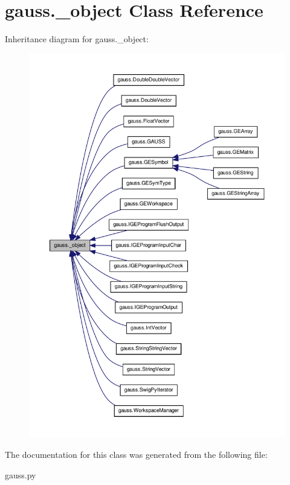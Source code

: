 \hypertarget{classgauss_1_1__object}{\section{gauss.\-\_\-object Class Reference}
\label{classgauss_1_1__object}
}


Inheritance diagram for gauss.\-\_\-object\-:\nopagebreak
\begin{figure}[H]
\begin{center}
\leavevmode
\includegraphics[width=350pt]{classgauss_1_1__object__inherit__graph}
\end{center}
\end{figure}


The documentation for this class was generated from the following file\-:\begin{DoxyCompactItemize}
\item 
gauss.\-py\end{DoxyCompactItemize}

